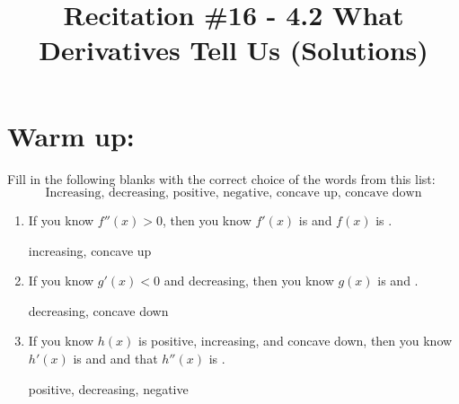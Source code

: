 \documentclass[nooutcomes]{ximera}
\title{Recitation \#16 - 4.2 What Derivatives Tell Us (Solutions)}
\begin{document}
\begin{abstract}		\end{abstract}
\maketitle

\section*{Warm up:} 
Fill in the following blanks with the correct choice of the words from this list:
$$ \text{Increasing, decreasing, positive, negative, concave up, concave down} $$

	\begin{enumerate}
	
	\item  If you know $f''(x) > 0$, then you know $f'(x)$ is \underline{\hspace{3cm}} and $f(x)$ is \underline{\hspace{3cm}}.
		\begin{freeResponse}
		increasing, concave up
		\end{freeResponse}
		
			
				
	\item  If you know $g'(x) < 0$ and decreasing, then you know $g(x)$ is \underline{\hspace{3cm}} and \underline{\hspace{3cm}}.
		\begin{freeResponse}
		decreasing, concave down
		\end{freeResponse}
		
			
				
	\item  If you know $h(x)$ is positive, increasing, and concave down, then you know $h'(x)$ is \underline{\hspace{3cm}} and \underline{\hspace{3cm}} and that $h''(x)$ is \underline{\hspace{3cm}}.
		\begin{freeResponse}
		positive, decreasing, negative
		\end{freeResponse}
		
			
				
	\end{enumerate}	
		
		
		
\end{document}
